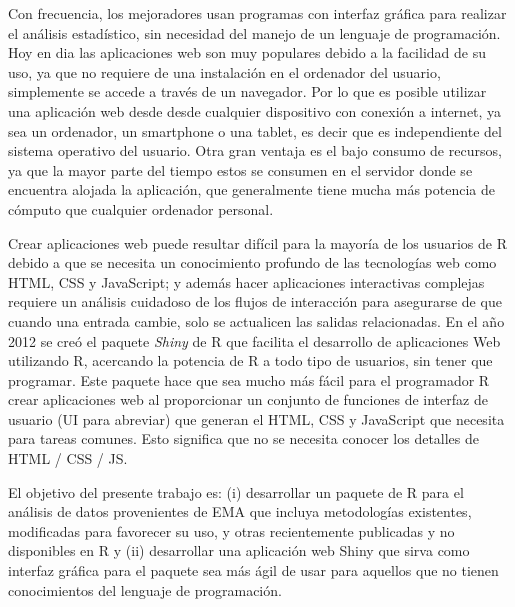 Con frecuencia, los mejoradores usan programas con interfaz gráfica para realizar el análisis estadístico, sin necesidad del manejo de un lenguaje de programación. Hoy en dia las aplicaciones web son muy populares debido a la facilidad de su uso, ya que no requiere de una instalación en el ordenador del usuario, simplemente se accede a través de un navegador. Por lo que es posible utilizar una aplicación web desde desde cualquier dispositivo con conexión a internet, ya sea un ordenador, un smartphone o una tablet, es decir que es independiente del sistema operativo del usuario. Otra gran ventaja es el bajo consumo de recursos, ya que la mayor parte del tiempo estos se consumen en el servidor donde se encuentra alojada la aplicación, que generalmente tiene mucha más potencia de cómputo que cualquier ordenador personal.

Crear aplicaciones web puede resultar difícil para la mayoría de los usuarios de R debido a que se necesita un conocimiento profundo de las tecnologías web como HTML, CSS y JavaScript; y además hacer aplicaciones interactivas complejas requiere un análisis cuidadoso de los flujos de interacción para asegurarse de que cuando una entrada cambie, solo se actualicen las salidas relacionadas. En el año 2012 se creó el paquete \emph{Shiny} de R que facilita el desarrollo de aplicaciones Web utilizando R, acercando la potencia de R a todo tipo de usuarios, sin tener que programar. Este paquete hace que sea mucho más fácil para el programador R crear aplicaciones web al proporcionar un conjunto de funciones de interfaz de usuario (UI para abreviar) que generan el HTML, CSS y JavaScript que necesita para tareas comunes. Esto significa que no se necesita conocer los detalles de HTML / CSS / JS. 



El objetivo del presente trabajo es: (i) desarrollar un paquete de R para el análisis de datos provenientes de EMA que incluya metodologías existentes, modificadas para favorecer su uso, y otras recientemente publicadas y no disponibles en R y (ii) desarrollar una aplicación web Shiny que sirva como interfaz gráfica para el paquete sea más ágil de usar para aquellos que no tienen conocimientos del lenguaje de programación.
